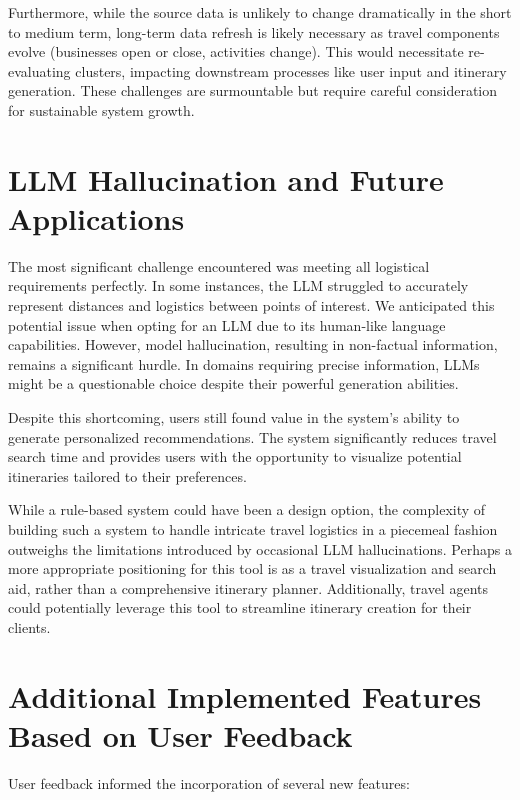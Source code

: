 \documentclass[12pt,a4paper]{report}
\begin{document}
Furthermore, while the source data is unlikely to change dramatically in the short to medium term, long-term data refresh is likely necessary as travel components evolve (businesses open or close, activities change). This would necessitate re-evaluating clusters, impacting downstream processes like user input and itinerary generation. These challenges are surmountable but require careful consideration for sustainable system growth.

\section{LLM Hallucination and Future Applications}

The most significant challenge encountered was meeting all logistical requirements perfectly. In some instances, the LLM struggled to accurately represent distances and logistics between points of interest. We anticipated this potential issue when opting for an LLM due to its human-like language capabilities. However, model hallucination, resulting in non-factual information, remains a significant hurdle. In domains requiring precise information, LLMs might be a questionable choice despite their powerful generation abilities.

Despite this shortcoming, users still found value in the system's ability to generate personalized recommendations. The system significantly reduces travel search time and provides users with the opportunity to visualize potential itineraries tailored to their preferences.

While a rule-based system could have been a design option, the complexity of building such a system to handle intricate travel logistics in a piecemeal fashion outweighs the limitations introduced by occasional LLM hallucinations.  Perhaps a more appropriate positioning for this tool is as a travel visualization and search aid, rather than a comprehensive itinerary planner. Additionally, travel agents could potentially leverage this tool to streamline itinerary creation for their clients.

\section{Additional Implemented Features Based on User Feedback}

User feedback informed the incorporation of several new features:
\end{document}
